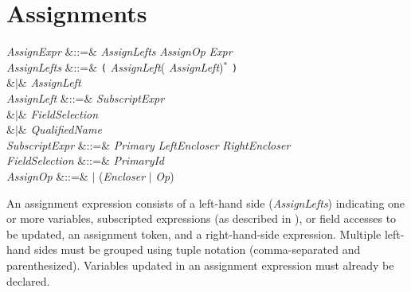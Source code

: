 %
%
%
%

\section{Assignments}


\begin{Grammar}
\emph{AssignExpr}
&::=& \emph{AssignLefts} \emph{AssignOp} \emph{Expr}\\

\emph{AssignLefts}
&::=& \texttt( \emph{AssignLeft}(\EXP{,} \emph{AssignLeft})$^*$ \texttt)\\
&$|$& \emph{AssignLeft}\\

\emph{AssignLeft}
&::=& \emph{SubscriptExpr}\\
&$|$& \emph{FieldSelection}\\
&$|$& \emph{QualifiedName}\\

\emph{SubscriptExpr} &::=&
\emph{Primary} \emph{LeftEncloser}   \emph{RightEncloser} \\

\emph{FieldSelection} &::=& \emph{Primary}\emph{Id}\\

\emph{AssignOp} &::=& \EXP{\ASSIGN} $|$ (\emph{Encloser} $|$ \emph{Op})\EXP{=}

\end{Grammar}

An assignment expression consists of a left-hand side
(\emph{AssignLefts}) indicating one or more variables, subscripted
expressions (as described in ), or
field accesses to be updated, an assignment token, and a
right-hand-side expression.  Multiple left-hand sides must be grouped
using tuple notation (comma-separated and parenthesized).  Variables
updated in an assignment expression must already be declared.

